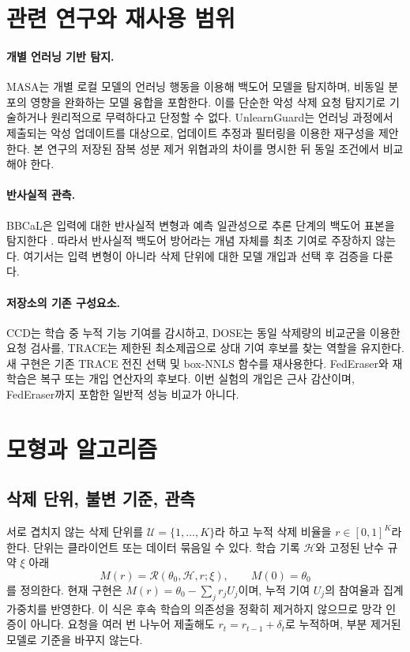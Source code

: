 \documentclass[10pt,a4paper]{article}
\begin{document}
\section{관련 연구와 재사용 범위}
\paragraph{개별 언러닝 기반 탐지.}
MASA는 개별 로컬 모델의 언러닝 행동을 이용해 백도어 모델을 탐지하며,
비동일 분포의 영향을 완화하는 모델 융합을 포함한다\cite{masa}.
이를 단순한 악성 삭제 요청 탐지기로 기술하거나 원리적으로 무력하다고 단정할 수 없다.
UnlearnGuard는 언러닝 과정에서 제출되는 악성 업데이트를 대상으로,
업데이트 추정과 필터링을 이용한 재구성을 제안한다\cite{unlearnguard}.
본 연구의 저장된 잠복 성분 제거 위협과의 차이를 명시한 뒤 동일 조건에서 비교해야 한다.

\paragraph{반사실적 관측.}
BBCaL은 입력에 대한 반사실적 변형과 예측 일관성으로 추론 단계의 백도어 표본을 탐지한다
\cite{bbcal}. 따라서 반사실적 백도어 방어라는 개념 자체를 최초 기여로 주장하지 않는다.
여기서는 입력 변형이 아니라 삭제 단위에 대한 모델 개입과 선택 후 검증을 다룬다.

\paragraph{저장소의 기존 구성요소.}
CCD는 학습 중 누적 기능 기여를 감시하고, DOSE는 동일 삭제량의 비교군을 이용한 요청 검사를,
TRACE는 제한된 최소제곱으로 상대 기여 후보를 찾는 역할을 유지한다.
새 구현은 기존 TRACE 전진 선택 및 box-NNLS 함수를 재사용한다.
FedEraser\cite{federaser}와 재학습은 복구 또는 개입 연산자의 후보다.
이번 실험의 개입은 근사 감산이며, FedEraser까지 포함한 일반적 성능 비교가 아니다.

\section{모형과 알고리즘}
\subsection{삭제 단위, 불변 기준, 관측}
서로 겹치지 않는 삭제 단위를 $\mathcal U=\{1,\dots,K\}$라 하고
누적 삭제 비율을 $r\in[0,1]^K$라 한다. 단위는 클라이언트 또는 데이터 묶음일 수 있다.
학습 기록 $\mathcal H$와 고정된 난수 규약 $\xi$ 아래
\begin{equation}
 M(r)=\mathcal R(\theta_0,\mathcal H,r;\xi),\qquad M(0)=\theta_0
\end{equation}
를 정의한다. 현재 구현은 $M(r)=\theta_0-\sum_jr_jU_j$이며,
누적 기여 $U_j$의 참여율과 집계 가중치를 반영한다.
이 식은 후속 학습의 의존성을 정확히 제거하지 않으므로 망각 인증이 아니다.
요청을 여러 번 나누어 제출해도 $r_t=r_{t-1}+\delta_t$로 누적하며,
부분 제거된 모델로 기준을 바꾸지 않는다.
\end{document}
